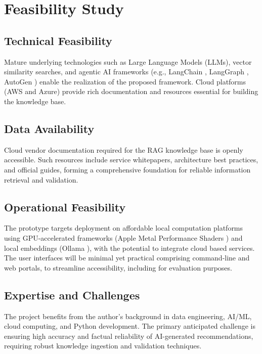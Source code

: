 \section{Feasibility Study}

\subsection{Technical Feasibility}

Mature underlying technologies such as Large Language Models (LLMs), vector similarity searches, and agentic AI frameworks (e.g., LangChain \cite{langchain2024docs}, LangGraph \cite{langgraph2024docs}, AutoGen \cite{wu2023autogen}) enable the realization of the proposed framework. Cloud platforms (AWS and Azure) provide rich documentation and resources essential for building the knowledge base.

\subsection{Data Availability}

Cloud vendor documentation required for the RAG knowledge base is openly accessible. Such resources include service whitepapers, architecture best practices, and official guides, forming a comprehensive foundation for reliable information retrieval and validation. %

\subsection{Operational Feasibility}

The prototype targets deployment on affordable local computation platforms using GPU-accelerated frameworks (Apple Metal Performance Shaders \cite{apple2024mps}) and local embeddings (Ollama \cite{ollama2024web}), with the potential to integrate cloud based services. The user interfaces will be minimal yet practical comprising command-line and web portals, to streamline accessibility, including for evaluation purposes.

\subsection{Expertise and Challenges}

The project benefits from the author's background in data engineering, AI/ML, cloud computing, and Python development. The primary anticipated challenge is ensuring high accuracy and factual reliability of AI-generated recommendations, requiring robust knowledge ingestion and validation techniques.

